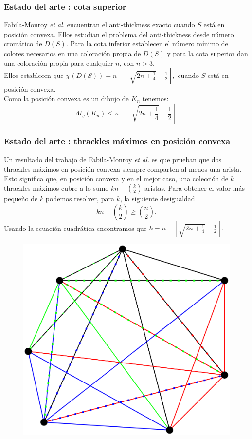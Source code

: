 \begin{frame}
\frametitle{Estado del arte : cota superior}
Fabila-Monroy \emph{et al.} encuentran el anti-thickness exacto cuando $S$ está en posición convexa. Ellos estudian el problema del anti-thickness desde número cromático de $D(S)$. Para la cota inferior establecen el número mínimo de colores necesarios en una coloración propia de $D(S)$ y para la cota superior dan una coloración propia para cualquier $n$, con $n>3$.
\pause 
\\[10pt]
Ellos establecen que $\chi(D(S)) = n - \left\lfloor\sqrt{2n + \frac{1}{4}} - \frac{1}{2} \right\rfloor, $ cuando $S$ está en posición convexa.
\pause
\\[10pt]
Como la posición convexa es un dibujo de $K_n$ tenemos: \[At_g(K_n) \leq n - \left\lfloor\sqrt{2n + \frac{1}{4}} - \frac{1}{2} \right\rfloor. \]
\end{frame}
\begin{frame}
\frametitle{Estado del arte : thrackles máximos en posición convexa}
Un resultado del trabajo de Fabila-Monroy \emph{et al.} es que prueban que dos thrackles máximos en posición convexa siempre comparten al menos una arista. Esto significa que, en posición convexa y en el mejor caso, una colección de $k$ thrackles máximos cubre a lo sumo $kn - \binom{k}{2}$ aristas. Para obtener el valor más pequeño de $k$ podemos resolver, para $k$, la siguiente desigualdad :
\[
  kn - \binom{k}{2} \geq \binom{n}{2}.
\]
Usando la ecuación cuadrática encontramos que $k = n - \left\lfloor\sqrt{2n + \frac{1}{4}} - \frac{1}{2} \right\rfloor.$
\end{frame}
\begin{frame}
\begin{figure}
	\centering
	\includegraphics[width=0.75\linewidth]{images/thrackles_maximos}
\end{figure}
\end{frame}

